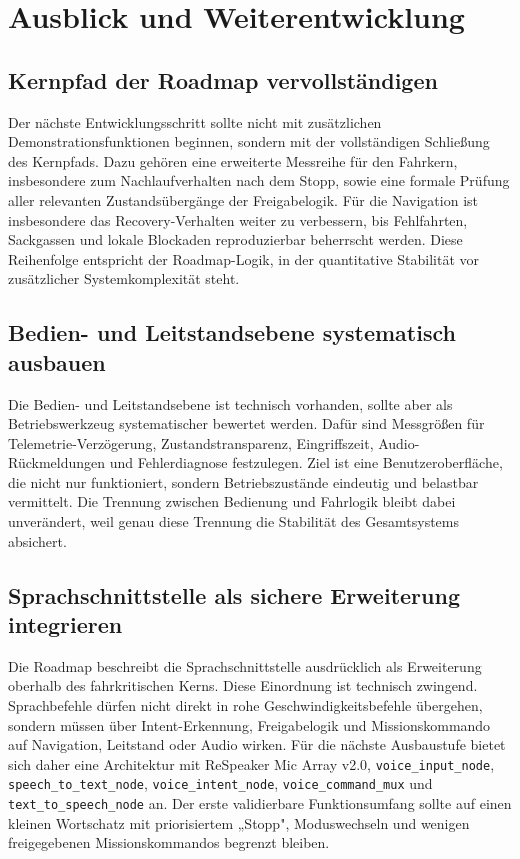 \section{Ausblick und Weiterentwicklung}

\subsection{Kernpfad der Roadmap vervollständigen}

Der nächste Entwicklungsschritt sollte nicht mit zusätzlichen Demonstrationsfunktionen beginnen, sondern mit der vollständigen Schließung des Kernpfads. Dazu gehören eine erweiterte Messreihe für den Fahrkern, insbesondere zum Nachlaufverhalten nach dem Stopp, sowie eine formale Prüfung aller relevanten Zustandsübergänge der Freigabelogik. Für die Navigation ist insbesondere das Recovery-Verhalten weiter zu verbessern, bis Fehlfahrten, Sackgassen und lokale Blockaden reproduzierbar beherrscht werden. Diese Reihenfolge entspricht der Roadmap-Logik, in der quantitative Stabilität vor zusätzlicher Systemkomplexität steht.

\subsection{Bedien- und Leitstandsebene systematisch ausbauen}

Die Bedien- und Leitstandsebene ist technisch vorhanden, sollte aber als Betriebswerkzeug systematischer bewertet werden. Dafür sind Messgrößen für Telemetrie-Verzögerung, Zustandstransparenz, Eingriffszeit, Audio-Rückmeldungen und Fehlerdiagnose festzulegen. Ziel ist eine Benutzeroberfläche, die nicht nur funktioniert, sondern Betriebszustände eindeutig und belastbar vermittelt. Die Trennung zwischen Bedienung und Fahrlogik bleibt dabei unverändert, weil genau diese Trennung die Stabilität des Gesamtsystems absichert.

\subsection{Sprachschnittstelle als sichere Erweiterung integrieren}

Die Roadmap beschreibt die Sprachschnittstelle ausdrücklich als Erweiterung oberhalb des fahrkritischen Kerns. Diese Einordnung ist technisch zwingend. Sprachbefehle dürfen nicht direkt in rohe Geschwindigkeitsbefehle übergehen, sondern müssen über Intent-Erkennung, Freigabelogik und Missionskommando auf Navigation, Leitstand oder Audio wirken. Für die nächste Ausbaustufe bietet sich daher eine Architektur mit ReSpeaker Mic Array v2.0, \texttt{voice\_input\_node}, \texttt{speech\_to\_text\_node}, \texttt{voice\_intent\_node}, \texttt{voice\_command\_mux} und \texttt{text\_to\_speech\_node} an. Der erste validierbare Funktionsumfang sollte auf einen kleinen Wortschatz mit priorisiertem „Stopp", Moduswechseln und wenigen freigegebenen Missionskommandos begrenzt bleiben.

